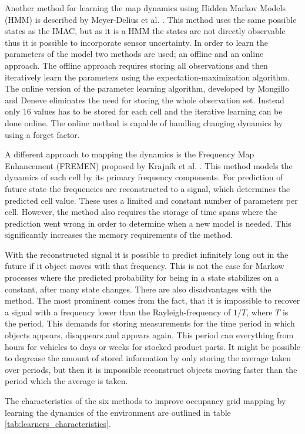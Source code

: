 Another method for learning the map dynamics using Hidden Markov Models (HMM) is described by Meyer-Delius et al. \cite{Meyer-Delius2012}. This method uses the same possible states as the IMAC, but as it is a HMM the states are not directly observable thus it is possible to incorporate sensor uncertainty. In order to learn the parameters of the model two methods are used; an offline and an online approach. The offline approach requires storing all observations and then iteratively learn the parameters using the expectation-maximization algorithm. The online version of the parameter learning algorithm, developed by Mongillo and Deneve \cite{Mongillo2008} eliminates the need for storing the whole observation set. Instead only 16 values has to be stored for each cell and the iterative learning can be done online. The online method is capable of handling changing dynamics by using a forget factor. 

A different approach to mapping the dynamics is the Frequency Map Enhancement (FREMEN) proposed by Krajník et al. \cite{Krajnik2014}. This method models the dynamics of each cell by its primary frequency components. 
For prediction of future state the frequencies are reconstructed to a signal, which determines the predicted cell value. 
These uses a limited and constant number of parameters per cell. However, the method also requires the storage of time spans where the prediction went wrong in order to determine when a new model is needed. This significantly increases the memory requirements of the method.

With the reconstructed signal it is possible to predict infinitely long out in the future if it object moves with that frequency. 
This is not the case for Markow processes where the predicted probability for being in a state stabilizes on a constant, after many state changes.
There are also disadvantages with the method.
The most prominent comes from the fact, that it is impossible to recover a signal with a frequency lower than the Rayleigh-frequency of $1/T$, where $T$ is the period. 
This demands for storing measurements for the time period in which objects appears, disappears and appears again. This period can everything from hours for vehicles to days or weeks for stocked product parts. 
It might be possible to degrease the amount of stored information by only storing the average taken over periods, but then it is impossible reconstruct objects moving faster than the period which the average is taken. 

The characteristics of the six methods to improve occupancy grid mapping by learning the dynamics of the environment are outlined in table \ref{tab:learners_characteristics}.

